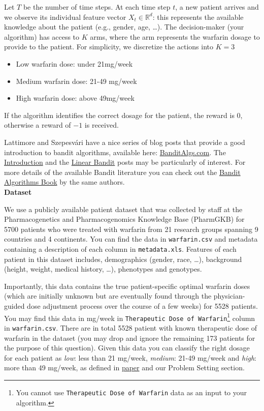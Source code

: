 Let $T$ be the number of time steps. At each time step $t$, a new patient arrives and we
observe its individual feature vector $X_t \in \mathbb{R}^d$: this represents the available knowledge about the patient (e.g., gender, age, \dots).  The decision-maker (your algorithm) has access to $K$ arms, where the arm represents the warfarin dosage to provide to the patient.
For simplicity, we discretize the actions into $K=3$
\begin{itemize}
    \item Low warfarin dose: under 21mg/week
    \item Medium warfarin dose: 21-49 mg/week
    \item High warfarin dose: above 49mg/week
\end{itemize}
If the algorithm identifies the correct dosage for the patient, the reward is 0, otherwise a reward of $-1$ is received.


\noindent Lattimore and Szepesvári have a nice series of blog posts that provide a good introduction to bandit algorithms, available here:  \href{http://banditalgs.com}{BanditAlgs.com}. The \href{http://banditalgs.com/2016/09/04/bandits-a-new-beginning/}{Introduction} and the \href{http://banditalgs.com/2016/10/19/stochastic-linear-bandits/}{Linear Bandit} posts may be particularly of interest. For more details of the available Bandit literature you can check out the \href{https://tor-lattimore.com/downloads/book/book.pdf}{Bandit Algorithms Book} by the same authors. \\


\textbf{Dataset}

We use a publicly available patient dataset that was collected by staff at the Pharmacogenetics and Pharmacogenomics Knowledge Base (PharmGKB) for 5700 patients who were treated with warfarin from 21 research groups spanning 9 countries and 4 continents. You can find the data in \texttt{warfarin.csv} and metadata containing a description of each column in \texttt{metadata.xls}. Features of each patient in this dataset includes, demographics (gender, race, \dots), background (height, weight, medical history, \dots), phenotypes and genotypes.

\noindent Importantly, this data contains the true patient-specific optimal warfarin doses (which are initially unknown but are eventually found through the physician-guided dose adjustment process over the course of a few weeks) for 5528 patients. You may find this data in mg/week in \texttt{Therapeutic Dose of Warfarin}\footnote{You cannot use \texttt{Therapeutic Dose of Warfarin} data as an input to your algorithm. } column in \texttt{warfarin.csv}. There are in total 5528 patient with known therapeutic dose of warfarin in the dataset (you may drop and ignore the remaining 173 patients for the purpose of this question). Given this data you can classify the right dosage for each patient as \textit{low}: less than 21 mg/week, \textit{medium}: 21-49 mg/week and \textit{high}: more than 49 mg/week, as defined in \href{https://www.nejm.org/doi/full/10.1056/nejmoa0809329}{paper} and our Problem Setting section.

